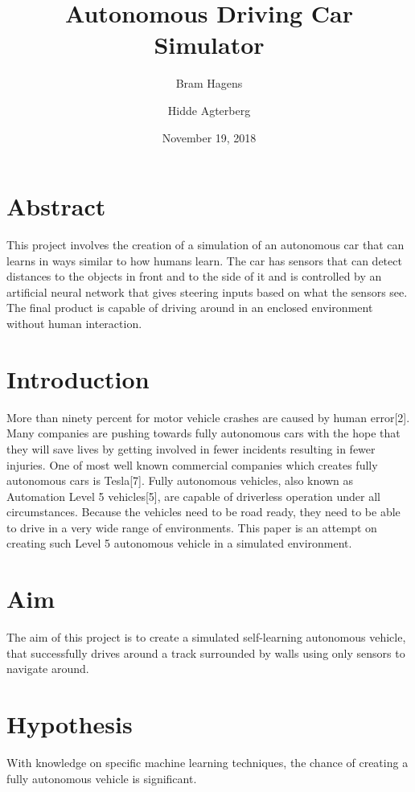 \documentclass{article}
\begin{document}
\title{Autonomous Driving Car Simulator}
\author[1]{Bram Hagens}
\author[1]{Hidde Agterberg}
\date{November 19, 2018}
\maketitle
\newpage

\tableofcontents
\newpage

\section{Abstract}
This project involves the creation of a simulation of an autonomous car that can learns in ways similar to how humans learn. The car has sensors that can detect distances to the objects in front and to the side of it and is controlled by an artificial neural network that gives steering inputs based on what the sensors see. The final product is capable of driving around in an enclosed environment without human interaction.
\newpage

\section{Introduction}
More than ninety percent for motor vehicle crashes are caused by human error[2]. Many companies are pushing towards fully autonomous cars with the hope that they will save lives by getting involved in fewer incidents resulting in fewer injuries. One of most well known commercial companies which creates fully autonomous cars is Tesla[7]. Fully autonomous vehicles, also known as Automation Level 5 vehicles[5], are capable of driverless operation under all circumstances. Because the vehicles need to be road ready, they need to be able to drive in a very wide range of environments. This paper is an attempt on creating such Level 5 autonomous vehicle in a simulated environment.

\section{Aim}
The aim of this project is to create a simulated self-learning autonomous vehicle, that successfully drives around a track surrounded by walls using only sensors to navigate around.

\section{Hypothesis}
With knowledge on specific machine learning techniques, the chance of creating a fully autonomous vehicle is significant. 
\end{document}

